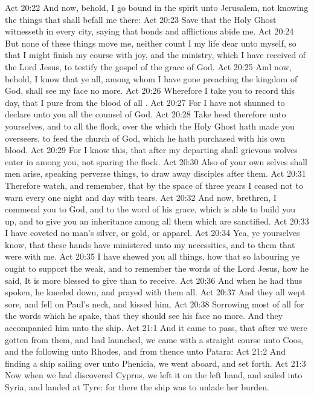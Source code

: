 \vs Act 20:22 And now, behold, I go bound in the spirit unto Jerusalem, not knowing the things that shall befall me there:
\vs Act 20:23 Save that the Holy Ghost witnesseth in every city, saying that bonds and afflictions abide me.
\vs Act 20:24 But none of these things move me, neither count I my life dear unto myself, so that I might finish my course with joy, and the ministry, which I have received of the Lord Jesus, to testify the gospel of the grace of God.
\vs Act 20:25 And now, behold, I know that ye all, among whom I have gone preaching the kingdom of God, shall see my face no more.
\vs Act 20:26 Wherefore I take you to record this day, that I  pure from the blood of all .
\vs Act 20:27 For I have not shunned to declare unto you all the counsel of God.
\vs Act 20:28 Take heed therefore unto yourselves, and to all the flock, over the which the Holy Ghost hath made you overseers, to feed the church of God, which he hath purchased with his own blood.
\vs Act 20:29 For I know this, that after my departing shall grievous wolves enter in among you, not sparing the flock.
\vs Act 20:30 Also of your own selves shall men arise, speaking perverse things, to draw away disciples after them.
\vs Act 20:31 Therefore watch, and remember, that by the space of three years I ceased not to warn every one night and day with tears.
\vs Act 20:32 And now, brethren, I commend you to God, and to the word of his grace, which is able to build you up, and to give you an inheritance among all them which are sanctified.
\vs Act 20:33 I have coveted no man's silver, or gold, or apparel.
\vs Act 20:34 Yea, ye yourselves know, that these hands have ministered unto my necessities, and to them that were with me.
\vs Act 20:35 I have shewed you all things, how that so labouring ye ought to support the weak, and to remember the words of the Lord Jesus, how he said, It is more blessed to give than to receive.
\vs Act 20:36 And when he had thus spoken, he kneeled down, and prayed with them all.
\vs Act 20:37 And they all wept sore, and fell on Paul's neck, and kissed him,
\vs Act 20:38 Sorrowing most of all for the words which he spake, that they should see his face no more. And they accompanied him unto the ship.
\vs Act 21:1 And it came to pass, that after we were gotten from them, and had launched, we came with a straight course unto Coos, and the  following unto Rhodes, and from thence unto Patara:
\vs Act 21:2 And finding a ship sailing over unto Phenicia, we went aboard, and set forth.
\vs Act 21:3 Now when we had discovered Cyprus, we left it on the left hand, and sailed into Syria, and landed at Tyre: for there the ship was to unlade her burden.
